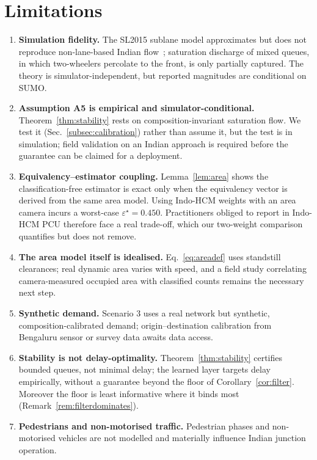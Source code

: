 \documentclass[journal]{IEEEtran}
\begin{document}
\section{Limitations}
\label{sec:limitations}
\begin{enumerate}
\item \textbf{Simulation fidelity.} The SL2015 sublane model approximates
      but does not reproduce non-lane-based Indian flow~\cite{b_simtram};
      saturation discharge of mixed queues, in which two-wheelers
      percolate to the front, is only partially captured. The theory is
      simulator-independent, but reported magnitudes are conditional on
      SUMO.
\item \textbf{Assumption A5 is empirical and simulator-conditional.}
      Theorem~\ref{thm:stability} rests on composition-invariant
      saturation flow. We test it (Sec.~\ref{subsec:calibration}) rather
      than assume it, but the test is in simulation; field validation on
      an Indian approach is required before the guarantee can be claimed
      for a deployment.
\item \textbf{Equivalency--estimator coupling.} Lemma~\ref{lem:area}
      shows the classification-free estimator is exact only when the
      equivalency vector is derived from the same area model. Using
      Indo-HCM weights with an area camera incurs a worst-case
      $\varepsilon^\star=0.450$. Practitioners obliged to report in
      Indo-HCM PCU therefore face a real trade-off, which our two-weight
      comparison quantifies but does not remove.
\item \textbf{The area model itself is idealised.} Eq.~\eqref{eq:areadef}
      uses standstill clearances; real dynamic area varies with speed,
      and a field study correlating camera-measured occupied area with
      classified counts remains the necessary next step.
\item \textbf{Synthetic demand.} Scenario 3 uses a real network but
      synthetic, composition-calibrated demand; origin--destination
      calibration from Bengaluru sensor or survey data awaits data
      access.
\item \textbf{Stability is not delay-optimality.} Theorem~\ref{thm:stability}
      certifies bounded queues, not minimal delay; the learned layer
      targets delay empirically, without a guarantee beyond the floor of
      Corollary~\ref{cor:filter}. Moreover the floor is least
      informative where it binds most (Remark~\ref{rem:filterdominates}).
\item \textbf{Pedestrians and non-motorised traffic.} Pedestrian phases
      and non-motorised vehicles are not modelled and materially
      influence Indian junction operation.
\end{enumerate}
\end{document}
